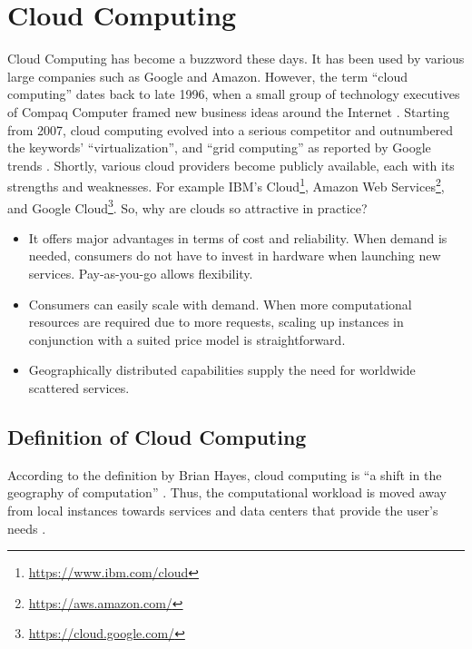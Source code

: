 \section{Cloud Computing}
\label{sec:cloud-computing}

Cloud Computing has become a buzzword these days.
It has been used by various large companies such as Google and Amazon.
However, the term \enquote{cloud computing} dates back to late 1996, when a small group of technology executives of Compaq Computer framed new business ideas around the Internet \cite{regalado2020}.
Starting from 2007, cloud computing evolved into a serious competitor and outnumbered the keywords' \enquote{virtualization}, and \enquote{grid computing} as reported by Google trends \cite{Wang2010}.
Shortly, various cloud providers become publicly available, each with its strengths and weaknesses.
For example IBM's Cloud\footnote{\url{https://www.ibm.com/cloud}}, Amazon Web Services\footnote{\url{https://aws.amazon.com/}}, and Google Cloud\footnote{\url{https://cloud.google.com/}}.
So, why are clouds so attractive in practice?

\begin{itemize}
    \item It offers major advantages in terms of cost and reliability.
    When demand is needed, consumers do not have to invest in hardware when launching new services.
    Pay-as-you-go allows flexibility.
    \item Consumers can easily scale with demand.
    When more computational resources are required due to more requests, scaling up instances in conjunction with a suited price model is straightforward.
    \item Geographically distributed capabilities supply the need for worldwide scattered services.
\end{itemize}

\subsection{Definition of Cloud Computing}

According to the definition by Brian Hayes, cloud computing is \enquote{a shift in the geography of computation} \cite{hayes2008}.
Thus, the computational workload is moved away from local instances towards services and data centers that provide the user's needs \cite{Armbrust2010}.

